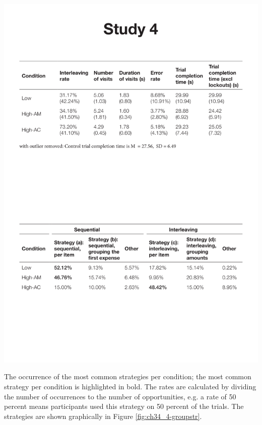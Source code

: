 \begin{table}[!ht]
  \centering
    \includegraphics[width=\textwidth]{images/ch34/ch4_4-StrategyFreq.pdf}
\caption[Study 4 occurrence of most common strategies]{The occurrence of the most common strategies per condition; the most common strategy per condition is highlighted in bold. The rates are calculated by dividing the number of occurrences to the number of opportunities, e.g. a  rate of 50 percent means participants used this strategy on 50 percent of the trials. The strategies are shown graphically in Figure \ref{fig:ch34_4-groupstr}.}
          \label{tbl:ch34_4-groupstr}
\end{table}

